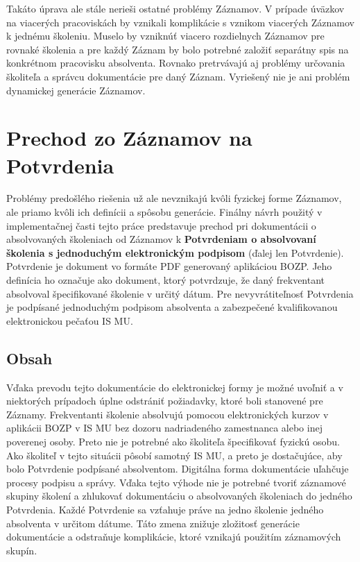 \documentclass[
  digital,     %
  oneside,     %
  nosansbold,  %
  nocolorbold, %
  lof,         %
  nolot,         %
]{fithesis4}
\begin{document}
Takáto úprava ale stále nerieši ostatné problémy Záznamov. V prípade úväzkov na viacerých pracoviskách by vznikali komplikácie s vznikom viacerých Záznamov k jednému školeniu. Muselo by vzniknúť viacero rozdielnych Záznamov pre rovnaké školenia a pre každý Záznam by bolo potrebné založiť separátny spis na konkrétnom pracovisku absolventa. Rovnako pretrvávajú aj problémy určovania školiteľa a správcu dokumentácie pre daný Záznam. Vyriešený nie je ani problém dynamickej generácie Záznamov.

\section{Prechod zo Záznamov na Potvrdenia}
Problémy predošlého riešenia už ale nevznikajú kvôli fyzickej forme Záznamov, ale priamo kvôli ich definícii a spôsobu generácie. Finálny návrh použitý v implementačnej časti tejto práce predstavuje prechod pri dokumentácii o absolvovaných školeniach od Záznamov k \textbf{Potvrdeniam o absolvovaní školenia s jednoduchým elektronickým podpisom} (ďalej len Potvrdenie). Potvrdenie je dokument vo formáte PDF generovaný aplikáciou BOZP. Jeho definícia ho označuje ako dokument, ktorý potvrdzuje, že daný frekventant absolvoval špecifikované školenie v určitý dátum. Pre nevyvrátiteľnosť Potvrdenia je podpísané jednoduchým podpisom absolventa a zabezpečené kvalifikovanou elektronickou pečaťou IS MU.

\subsection*{Obsah}
Vďaka prevodu tejto dokumentácie do elektronickej formy je možné uvoľniť a v niektorých prípadoch úplne odstrániť požiadavky, ktoré boli stanovené pre Záznamy. 
Frekventanti školenie absolvujú pomocou elektronických kurzov v aplikácii BOZP v IS MU bez dozoru nadriadeného zamestnanca alebo inej poverenej osoby. Preto nie je potrebné ako školiteľa špecifikovať fyzickú osobu. Ako školiteľ v tejto situácii pôsobí samotný IS MU, a preto je dostačujúce, aby bolo Potvrdenie podpísané absolventom.
Digitálna forma dokumentácie uľahčuje procesy podpisu a správy. Vďaka tejto výhode nie je potrebné tvoriť záznamové skupiny školení a zhlukovať dokumentáciu o absolvovaných školeniach do jedného Potvrdenia. Každé Potvrdenie sa vzťahuje práve na jedno školenie jedného absolventa v určitom dátume. Táto zmena znižuje zložitosť generácie dokumentácie a odstraňuje komplikácie, ktoré vznikajú použitím záznamových skupín.
\end{document}
